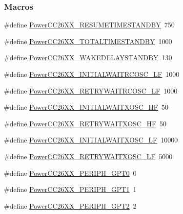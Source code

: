 \subsubsection*{Macros}
\begin{DoxyCompactItemize}
\item 
\#define \hyperlink{_power_c_c26_x_x_8h_a27633fb4e1e9ef1d16b4c526f564cd22}{Power\+C\+C26\+X\+X\+\_\+\+R\+E\+S\+U\+M\+E\+T\+I\+M\+E\+S\+T\+A\+N\+D\+B\+Y}~750
\item 
\#define \hyperlink{_power_c_c26_x_x_8h_a7fa063e42fa24f7d5d7db2c0d420c4a6}{Power\+C\+C26\+X\+X\+\_\+\+T\+O\+T\+A\+L\+T\+I\+M\+E\+S\+T\+A\+N\+D\+B\+Y}~1000
\item 
\#define \hyperlink{_power_c_c26_x_x_8h_a03efface3d3941dd7b91d9653cc992b4}{Power\+C\+C26\+X\+X\+\_\+\+W\+A\+K\+E\+D\+E\+L\+A\+Y\+S\+T\+A\+N\+D\+B\+Y}~130
\item 
\#define \hyperlink{_power_c_c26_x_x_8h_af69c407f50204cbe8e3f71f78d1633bf}{Power\+C\+C26\+X\+X\+\_\+\+I\+N\+I\+T\+I\+A\+L\+W\+A\+I\+T\+R\+C\+O\+S\+C\+\_\+\+L\+F}~1000
\item 
\#define \hyperlink{_power_c_c26_x_x_8h_a6976f53c142aad31a7deb67d6a370e4a}{Power\+C\+C26\+X\+X\+\_\+\+R\+E\+T\+R\+Y\+W\+A\+I\+T\+R\+C\+O\+S\+C\+\_\+\+L\+F}~1000
\item 
\#define \hyperlink{_power_c_c26_x_x_8h_ae154f9cbcf8d09e8bc2cb417b1e48c16}{Power\+C\+C26\+X\+X\+\_\+\+I\+N\+I\+T\+I\+A\+L\+W\+A\+I\+T\+X\+O\+S\+C\+\_\+\+H\+F}~50
\item 
\#define \hyperlink{_power_c_c26_x_x_8h_ad31fbc0ab3dbd0aa6298d9f90a538534}{Power\+C\+C26\+X\+X\+\_\+\+R\+E\+T\+R\+Y\+W\+A\+I\+T\+X\+O\+S\+C\+\_\+\+H\+F}~50
\item 
\#define \hyperlink{_power_c_c26_x_x_8h_a5b63c7d42624c45f7e99957ef9cebd69}{Power\+C\+C26\+X\+X\+\_\+\+I\+N\+I\+T\+I\+A\+L\+W\+A\+I\+T\+X\+O\+S\+C\+\_\+\+L\+F}~10000
\item 
\#define \hyperlink{_power_c_c26_x_x_8h_a5ca11beb72ea210b1ba5c1172654993d}{Power\+C\+C26\+X\+X\+\_\+\+R\+E\+T\+R\+Y\+W\+A\+I\+T\+X\+O\+S\+C\+\_\+\+L\+F}~5000
\item 
\#define \hyperlink{_power_c_c26_x_x_8h_aa15ce915efc606bfc93aa1a1dba3c766}{Power\+C\+C26\+X\+X\+\_\+\+P\+E\+R\+I\+P\+H\+\_\+\+G\+P\+T0}~0
\item 
\#define \hyperlink{_power_c_c26_x_x_8h_a1af8297196f468c056ab88ff4b6adaf3}{Power\+C\+C26\+X\+X\+\_\+\+P\+E\+R\+I\+P\+H\+\_\+\+G\+P\+T1}~1
\item 
\#define \hyperlink{_power_c_c26_x_x_8h_a07689c7adbc7112e4c7fedfcd6465abe}{Power\+C\+C26\+X\+X\+\_\+\+P\+E\+R\+I\+P\+H\+\_\+\+G\+P\+T2}~2

\end{DoxyCompactItemize}
